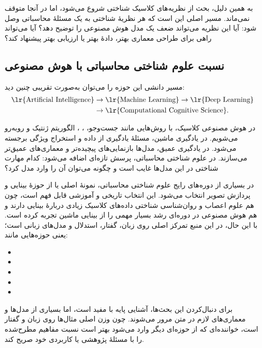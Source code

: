 به همین دلیل، بحث از نظریه‌های کلاسیک شناختی شروع می‌شود، اما در آنجا متوقف نمی‌ماند. مسیر اصلی این است که هر نظریهٔ شناختی به یک مسئلهٔ محاسباتی وصل شود: آیا این نظریه می‌تواند ضعف یک مدل هوش مصنوعی را توضیح دهد؟ آیا می‌تواند راهی برای طراحی معماری بهتر، دادهٔ بهتر یا ارزیابی بهتر پیشنهاد کند؟

\subsection{نسبت علوم شناختی محاسباتی با هوش مصنوعی}
مسیر دانشی این حوزه را می‌توان به‌صورت تقریبی چنین دید:
\[
\begin{aligned}
\text{\lr{Artificial Intelligence}}
&\rightarrow
\text{\lr{Machine Learning}}
\rightarrow
\text{\lr{Deep Learning}}\\
&\rightarrow
\text{\lr{Computational Cognitive Science}}.
\end{aligned}
\]

در هوش مصنوعی کلاسیک، با روش‌هایی مانند جست‌وجو، ، ، الگوریتم ژنتیک و  روبه‌رو می‌شویم. در یادگیری ماشین، مسئلهٔ یادگیری از داده و استخراج ویژگی برجسته می‌شود. در یادگیری عمیق، مدل‌ها بازنمایی‌های پیچیده‌تر و معماری‌های عمیق‌تر می‌سازند. در علوم شناختی محاسباتی، پرسش تازه‌ای اضافه می‌شود: کدام مهارت شناختی در این مدل‌ها غایب است و چگونه می‌توان آن را وارد مدل کرد؟

در بسیاری از دوره‌های رایج علوم شناختی محاسباتی، نمونهٔ اصلی یا  از حوزهٔ بینایی و پردازش تصویر انتخاب می‌شود. این انتخاب تاریخی و آموزشی قابل فهم است، چون هم علوم اعصاب و روان‌شناسی شناختی داده‌های کلاسیک زیادی دربارهٔ بینایی دارند و هم هوش مصنوعی در دوره‌ای رشد بسیار مهمی را از بینایی ماشین تجربه کرده است. با این حال، در این منبع تمرکز اصلی روی زبان، گفتار، استدلال و مدل‌های زبانی است؛ یعنی حوزه‌هایی مانند:
\begin{itemize}
  \item {}
  \item {}
  \item {}
  \item {}
  \item {}
\end{itemize}

برای دنبال‌کردن این بحث‌ها، آشنایی پایه با  مفید است، اما بسیاری از مدل‌ها و معماری‌های لازم در متن مرور می‌شوند. چون وزن اصلی مثال‌ها روی زبان و گفتار است، خواننده‌ای که از حوزه‌ای دیگر وارد می‌شود بهتر است نسبت مفاهیم مطرح‌شده را با مسئلهٔ پژوهشی یا کاربردی خود صریح کند.

